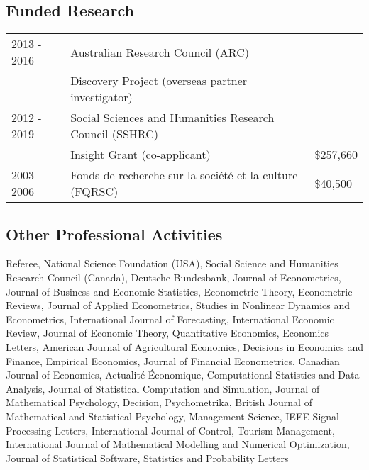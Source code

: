 \documentclass[12pt]{article}
\begin{document}





\subsection*{Funded Research}

\begin{tabular}{lll}
2013 - 2016
& Australian Research Council (ARC) \\
& Discovery Project (overseas partner investigator) \\
2012 - 2019
& Social Sciences and Humanities Research Council (SSHRC) \\
& Insight Grant (co-applicant)
& \$257,660 \\
2003 - 2006
& Fonds de recherche sur la soci\'et\'e et la culture (FQRSC)
& \$40,500 \\
\end{tabular}

\subsection*{Other Professional Activities}

Referee,
National Science Foundation (USA),
Social Science and Humanities Research Council (Canada),
Deutsche Bundesbank,
Journal of Econometrics,
Journal of Business and Economic Statistics,
Econometric Theory,
Econometric Reviews,
Journal of Applied Econometrics,
Studies in Nonlinear Dynamics and Econometrics,
International Journal of Forecasting,
International Economic Review,
Journal of Economic Theory,
Quantitative Economics,
Economics Letters,
American Journal of Agricultural Economics,
Decisions in Economics and Finance,
Empirical Economics,
Journal of Financial Econometrics,
Canadian Journal of Economics,
Actualit\'e \'Economique,
Computational Statistics and Data Analysis,
Journal of Statistical Computation and Simulation,
Journal of Mathematical Psychology,
Decision,
Psychometrika,
British Journal of Mathematical and Statistical Psychology,
Management Science,
IEEE Signal Processing Letters,
International Journal of Control,
Tourism Management,
International Journal of Mathematical Modelling and Numerical Optimization,
Journal of Statistical Software,
Statistics and Probability Letters
\end{document}
